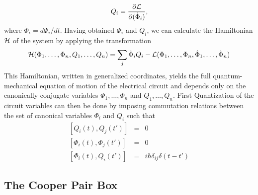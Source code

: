 %
\begin{equation}
Q_i = \frac{\partial \begin{mathcal}L\end{mathcal}}{\partial(\dot{\Phi}_i)}, \label{eq:canonical_momentum}
\end{equation}
%
where $\dot{\Phi}_i=d\Phi_i/dt$. Having obtained $\Phi_i$ and $Q_i$, we can calculate the Hamiltonian $\begin{mathcal}H\end{mathcal}$ of the system by applying the transformation
%
\begin{equation}
\begin{mathcal}H\end{mathcal}(\Phi_1,\hdots,\Phi_n,Q_1,\hdots,Q_n) = \sum\limits_j \dot{\Phi}_i Q_i - \begin{mathcal}L\end{mathcal}(\Phi_1,\hdots,\Phi_n,\dot{\Phi}_1,\hdots,\dot{\Phi}_n) \label{eq:l_to_h}
\end{equation}
%
This Hamiltonian, written in generalized coordinates, yields the full quantum-mechanical equation of motion of the electrical circuit and depends only on the canonically conjugate variables $\Phi_{1},\hdots,\Phi_n$ and $Q_1,\hdots,Q_n$. First Quantization of the circuit variables can then be done by imposing commutation relations between the set of canonical variables $\Phi_i$ and $Q_i$ such that
%
\begin{eqnarray}
\left[Q_i(t),Q_j(t')\right] & = & 0 \\
\left[\Phi_i(t),\Phi_j(t') \right] & = & 0 \\
\left[\Phi_i(t),Q_i(t')\right] & = & i\hbar\delta_{ij}\delta(t-t') \label{eq:quantization_commutation_relations}
\end{eqnarray}
%


\subsection{The Cooper Pair Box}

